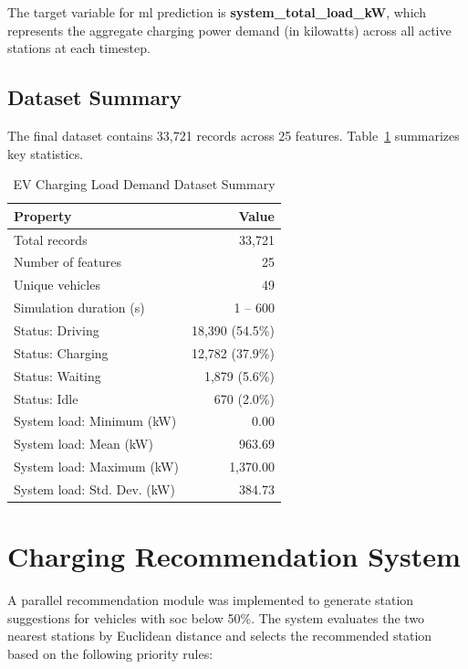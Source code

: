\documentclass{thesis-library}
\begin{document}
The target variable for \Gls{ml} prediction is \textbf{system\_total\_load\_kW}, which
represents the aggregate charging power demand (in kilowatts) across all active stations
at each timestep.

\subsection{Dataset Summary}

The final dataset contains 33,721 records across 25 features. Table~\ref{tab:dataset}
summarizes key statistics.

\begin{table}[htbp]
\caption{EV Charging Load Demand Dataset Summary}
\label{tab:dataset}
\begin{center}
\begin{tabular}{|l|r|}
\hline
\textbf{Property} & \textbf{Value} \\
\hline
Total records                & 33,721 \\
Number of features           & 25 \\
Unique vehicles              & 49 \\
Simulation duration (s)      & 1 -- 600 \\
Status: Driving              & 18,390 (54.5\%) \\
Status: Charging             & 12,782 (37.9\%) \\
Status: Waiting              & 1,879 (5.6\%) \\
Status: Idle                 & 670 (2.0\%) \\
System load: Minimum (kW)    & 0.00 \\
System load: Mean (kW)       & 963.69 \\
System load: Maximum (kW)    & 1,370.00 \\
System load: Std. Dev. (kW)  & 384.73 \\
\hline
\end{tabular}
\end{center}
\end{table}

\section{Charging Recommendation System}

A parallel recommendation module was implemented to generate station suggestions for
vehicles with \Gls{soc} below 50\%. The system evaluates the two nearest stations by
Euclidean distance and selects the recommended station based on the following priority
rules:
\end{document}
